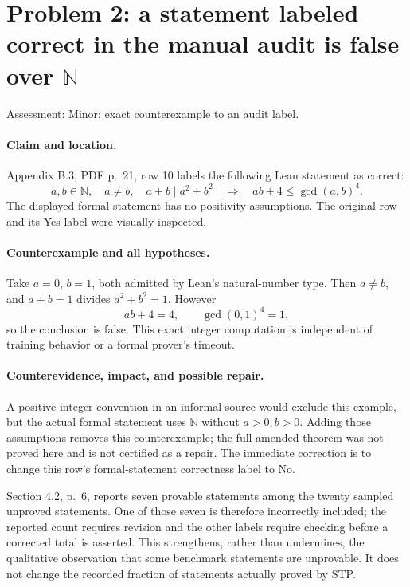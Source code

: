 \documentclass[10pt]{article}
\begin{document}
\section*{Problem 2: a statement labeled correct in the manual audit is false over \(\mathbb N\)}
Assessment: Minor; exact counterexample to an audit label.\par
\paragraph*{Claim and location.}\mbox{}\par
Appendix B.3, PDF p. 21, row 10 labels the following Lean statement as correct: \[a,b\in\mathbb N,\quad a\ne b,\quad a+b\mid a^2+b^2
\quad\Longrightarrow\quad ab+4\le\gcd(a,b)^4.\] The displayed formal statement has no positivity assumptions. The original row and its Yes label were visually inspected.\par
\paragraph*{Counterexample and all hypotheses.}\mbox{}\par
Take \(a=0\), \(b=1\), both admitted by Lean’s natural-number type. Then \(a\ne b\), and \(a+b=1\) divides \(a^2+b^2=1\). However \[ab+4=4,\qquad \gcd(0,1)^4=1,\] so the conclusion is false. This exact integer computation is independent of training behavior or a formal prover’s timeout.\par
\paragraph*{Counterevidence, impact, and possible repair.}\mbox{}\par
A positive-integer convention in an informal source would exclude this example, but the actual formal statement uses \(\mathbb N\) without \(a>0,b>0\). Adding those assumptions removes this counterexample; the full amended theorem was not proved here and is not certified as a repair. The immediate correction is to change this row’s formal-statement correctness label to No.\par
Section 4.2, p. 6, reports seven provable statements among the twenty sampled unproved statements. One of those seven is therefore incorrectly included; the reported count requires revision and the other labels require checking before a corrected total is asserted. This strengthens, rather than undermines, the qualitative observation that some benchmark statements are unprovable. It does not change the recorded fraction of statements actually proved by STP.\par
\end{document}
